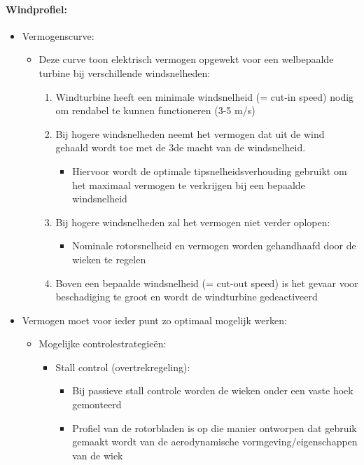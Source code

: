 \documentclass[12pt]{article}
\begin{document}
\paragraph{Windprofiel:}
\begin{itemize}
    \item Vermogenscurve:\begin{itemize}
        \item Deze curve toon elektrisch vermogen opgewekt voor een welbepaalde turbine bij verschillende windsnelheden:\begin{enumerate}
            \item Windturbine heeft een minimale windsnelheid (= cut-in speed) nodig om rendabel te kunnen functioneren (3-5 m/s)
            \item Bij hogere windsnelheden neemt het vermogen dat uit de wind gehaald wordt toe met de 3de macht van de windsnelheid.\begin{itemize}
                \item Hiervoor wordt de optimale tipsnelheidsverhouding gebruikt om het maximaal vermogen te verkrijgen bij een bepaalde windsnelheid
            \end{itemize}
            \item Bij hogere windsnelheden zal het vermogen niet verder oplopen:\begin{itemize}
                \item Nominale rotorsnelheid en vermogen worden gehandhaafd door de wieken te regelen
            \end{itemize}
            \item Boven een bepaalde windsnelheid (= cut-out speed) is het gevaar voor beschadiging te groot en wordt de windturbine gedeactiveerd
        \end{enumerate}
    \end{itemize}
    \item Vermogen moet voor ieder punt zo optimaal mogelijk werken:\begin{itemize}
        \item Mogelijke controlestrategieën:\begin{itemize}
            \item Stall control (overtrekregeling):\begin{itemize}
                \item Bij passieve stall controle worden de wieken onder een vaste hoek gemonteerd
                \item Profiel van de rotorbladen is op die manier ontworpen dat gebruik gemaakt wordt van de aerodynamische vormgeving/eigenschappen van de wiek

\end{itemize}
\end{itemize}
\end{itemize}
\end{itemize}
\end{document}
